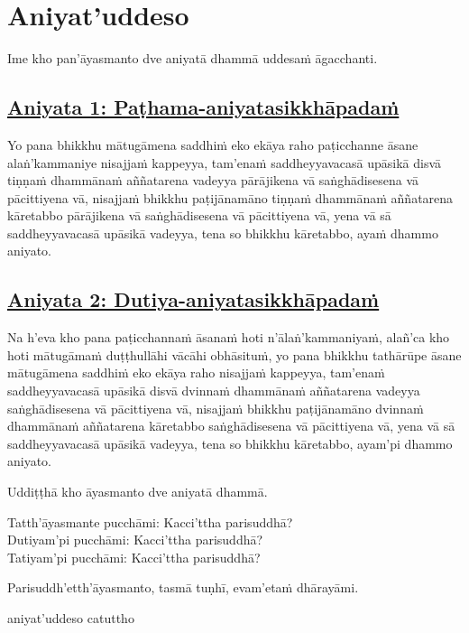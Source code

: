 \section{Aniyat'uddeso}
\label{aniy}

\begin{intro}
  Ime kho pan'āyasmanto dve aniyatā dhammā uddesaṁ āgacchanti.
\end{intro}

\subsection*{\hyperref[unc1]{Aniyata 1: Paṭhama-aniyatasikkhāpadaṁ}}
\label{aniy1}
Yo pana bhikkhu mātugāmena saddhiṁ eko ekāya raho paṭicchanne āsane alaṅ'kammaniye nisajjaṁ kappeyya, tam'enaṁ saddheyyavacasā upāsikā disvā tiṇṇaṁ dhammānaṁ aññatarena vadeyya pārājikena vā saṅghādisesena vā pācittiyena vā, nisajjaṁ bhikkhu paṭijānamāno tiṇṇaṁ dhammānaṁ aññatarena kāretabbo pārājikena vā saṅghādisesena vā pācittiyena vā, yena vā sā saddheyyavacasā upāsikā vadeyya, tena so bhikkhu kāretabbo, ayaṁ dhammo aniyato.

\subsection*{\hyperref[unc2]{Aniyata 2: Dutiya-aniyatasikkhāpadaṁ}}
\label{aniy2}
Na h'eva kho pana paṭicchannaṁ āsanaṁ hoti n'ālaṅ'kammaniyaṁ, alañ'ca kho hoti mātugāmaṁ duṭṭhullāhi vācāhi obhāsituṁ, yo pana bhikkhu tathārūpe āsane mātugāmena saddhiṁ eko ekāya raho nisajjaṁ kappeyya, tam'enaṁ saddheyyavacasā upāsikā disvā dvinnaṁ dhammānaṁ aññatarena vadeyya saṅghādisesena vā pācittiyena vā, nisajjaṁ bhikkhu paṭijānamāno dvinnaṁ dhammānaṁ aññatarena kāretabbo saṅghādisesena vā pācittiyena vā, yena vā sā saddheyyavacasā upāsikā vadeyya, tena so bhikkhu kāretabbo, ayam'pi dhammo aniyato.

\medskip

\begin{center}
Uddiṭṭhā kho āyasmanto dve aniyatā dhammā.

\smallskip

Tatth'āyasmante pucchāmi: Kacci'ttha parisuddhā?\\
Dutiyam'pi pucchāmi: Kacci'ttha parisuddhā?\\
Tatiyam'pi pucchāmi: Kacci'ttha parisuddhā?

\smallskip

Parisuddh'etth'āyasmanto, tasmā tuṇhī, evam'etaṁ dhārayāmi.
\end{center}

\begin{outro}
  aniyat'uddeso catuttho
\end{outro}

\clearpage
